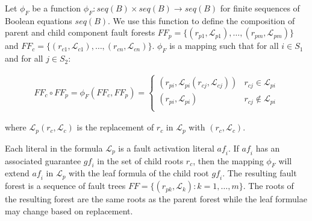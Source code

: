 Let $\phi_F$ be a function $\phi _F: \mathit{seq(B)} \times \mathit{seq(B)} \rightarrow \mathit{seq(B)}$ for finite sequences of Boolean equations $\mathit{seq(B)}$. We use this function to define the composition of parent and child component fault forests $\mathit{FF}_p = \{(r_{p1},\mathcal{L}_{p1}), \dots, (r_ {pm}, \mathcal{L}_{pm})\}$ and $\mathit{FF}_c = \{(r_{c1},\mathcal{L}_{c1}), \dots, (r_ {cn}, \mathcal{L}_{cn})\}$. $\phi_F$ is a mapping such that for all $i \in S_1$ and for all $j \in S_2$: 

\begin{gather}
\mathit{FF}_c \circ \mathit{FF}_p = \phi_F(\mathit{FF}_c, \mathit{FF}_p) =\begin{cases} 
      (r_{pi}, \mathcal{L}_{pi}(r_{cj}, \mathcal{L}_{cj})) & r_{cj} \in \mathcal{L}_{pi} \\
      (r_{pi}, \mathcal{L}_{pi}) & r_{cj} \not\in \mathcal{L}_{pi} \\
   \end{cases}
\end{gather}

where $\mathcal{L}_p(r_c, \mathcal{L}_c)$ is the replacement of $r_c$ in $\mathcal{L}_p$ with $(r_c, \mathcal{L}_c)$.

Each literal in the formula $\mathcal{L}_p$ is a fault activation literal $\mathit{af}_i$. If $\mathit{af}_i$ has an associated guarantee $\mathit{gf}_i$ in the set of child roots $r_c$, then the mapping $\phi_F$ will extend $\mathit{af}_i$ in $\mathcal{L}_p$ with the leaf formula of the child root $\mathit{gf}_i$.  The resulting fault forest is a sequence of fault trees $\mathit{FF} = \{(r_{pk}, \mathcal{L}_{k}): k = 1,\dots,m\}$. The roots of the resulting forest are the same roots as  the parent forest while the leaf formulae may change based on replacement. 



